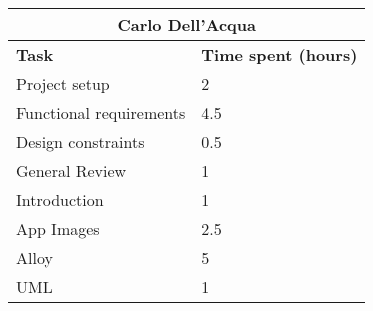 \begin{table}[h]
  \centering
  \begin{tabular}{l|l}
    \multicolumn{2}{c}{\textbf{Carlo Dell'Acqua}} \\
    \hline
    \textbf{Task} & \textbf{Time spent (hours)}\\
    \hline
    Project setup & 2 \\
    Functional requirements & 4.5 \\
    Design constraints & 0.5 \\
    General Review & 1 \\
    Introduction & 1 \\
    App Images & 2.5 \\
    Alloy & 5 \\
    UML & 1 \\
  \end{tabular}
\end{table}